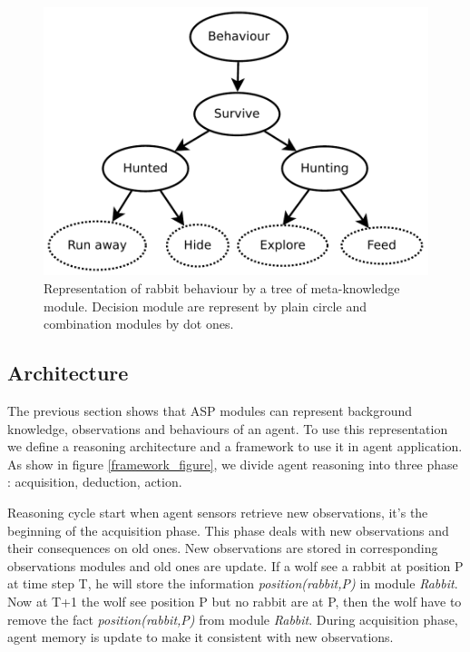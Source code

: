 \documentclass{aamas2012}
\begin{document}
	\begin{figure}
		\centering
		\includegraphics[keepaspectratio=true, scale=0.5]{behaviour_tree.pdf}
		\caption
		{
			\label{behaviour_tree}
			Representation of rabbit behaviour by a tree of meta-knowledge module.
			Decision module are represent by plain circle and combination modules by dot ones.
		}
	\end{figure}
	
\subsection{Architecture}

	The previous section shows that ASP modules can represent background knowledge, observations and behaviours of an agent.
	To use this representation we define a reasoning architecture and a framework to use it in agent application.
	As show in figure \ref{framework_figure}, we divide agent reasoning into three phase : acquisition, deduction, action.
	
	Reasoning cycle start when agent sensors retrieve new observations, it's the beginning of the acquisition phase.
	This phase deals with new observations and their consequences on old ones.
	New observations are stored in corresponding observations modules and old ones are update.
	If a wolf see a rabbit at position P at time step T, he will store the information \textit{position(rabbit,P)} in module \textit{Rabbit}.
	Now at T+1 the wolf see position P but no rabbit are at P, then the wolf have to remove the fact \textit{position(rabbit,P)} from module \textit{Rabbit}.
	During acquisition phase, agent memory is update to make it consistent with new observations.
	
\end{document}
